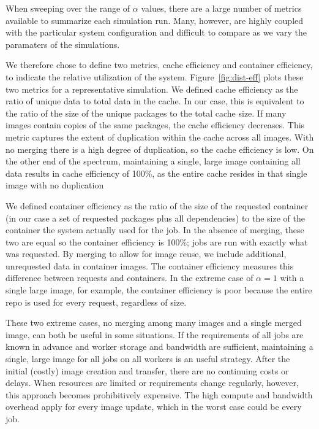\documentclass[sigconf]{acmart}
\begin{document}
When sweeping over the range of $\alpha$ values,
there are a large number of metrics available to summarize each simulation run.
Many, however, are highly coupled with the particular system configuration and difficult to compare as we vary the paramaters of the simulations.

We therefore chose to define two metrics, cache efficiency and container efficiency,
to indicate the relative utilization of the system.
Figure~\ref{fig:dist-eff} plots these two metrics for a representative simulation.
We defined cache efficiency as the ratio of unique data to total data in the cache.
In our case, this is equivalent to the ratio of the size of the unique packages to the total cache size.
If many images contain copies of the same packages,
the cache efficiency decreases.
This metric captures the extent of duplication within the cache across all images.
With no merging there is a high degree of duplication,
so the cache efficiency is low.
On the other end of the spectrum,
maintaining a single, large image containing all data results in cache efficiency of 100\%,
as the entire cache resides in that single image with no duplication

We defined container efficiency as the ratio of the size of the requested container
(in our case a set of requested packages plus all dependencies)
to the size of the container the system actually used for the job.
In the absence of merging,
these two are equal so the container efficiency is 100\%;
jobs are run with exactly what was requested.
By merging to allow for image reuse,
we include additional, unrequested data in container images.
The container efficiency measures this difference between requests and containers.
In the extreme case of $\alpha=1$ with a single large image, for example,
the container efficiency is poor because the entire repo is used for every request,
regardless of size.

These two extreme cases, no merging among many images and a single merged image,
can both be useful in some situations.
If the requirements of all jobs are known in advance and worker storage and bandwidth are sufficient,
maintaining a single, large image for all jobs on all workers is an useful strategy.
After the initial (costly) image creation and transfer,
there are no continuing costs or delays.
When resources are limited or requirements change regularly,
however, this approach becomes prohibitively expensive.
The high compute and bandwidth overhead apply for every image update,
which in the worst case could be every job.
\end{document}
